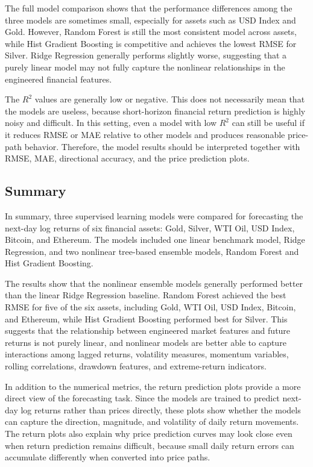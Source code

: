 \documentclass[12pt]{article}
\begin{document}
The full model comparison shows that the performance differences among the three models are sometimes small, especially for assets such as USD Index and Gold. However, Random Forest is still the most consistent model across assets, while Hist Gradient Boosting is competitive and achieves the lowest RMSE for Silver. Ridge Regression generally performs slightly worse, suggesting that a purely linear model may not fully capture the nonlinear relationships in the engineered financial features.

The $R^2$ values are generally low or negative. This does not necessarily mean that the models are useless, because short-horizon financial return prediction is highly noisy and difficult. In this setting, even a model with low $R^2$ can still be useful if it reduces RMSE or MAE relative to other models and produces reasonable price-path behavior. Therefore, the model results should be interpreted together with RMSE, MAE, directional accuracy, and the price prediction plots.

\subsection{Summary}

In summary, three supervised learning models were compared for forecasting the next-day log returns of six financial assets: Gold, Silver, WTI Oil, USD Index, Bitcoin, and Ethereum. The models included one linear benchmark model, Ridge Regression, and two nonlinear tree-based ensemble models, Random Forest and Hist Gradient Boosting.

The results show that the nonlinear ensemble models generally performed better than the linear Ridge Regression baseline. Random Forest achieved the best RMSE for five of the six assets, including Gold, WTI Oil, USD Index, Bitcoin, and Ethereum, while Hist Gradient Boosting performed best for Silver. This suggests that the relationship between engineered market features and future returns is not purely linear, and nonlinear models are better able to capture interactions among lagged returns, volatility measures, momentum variables, rolling correlations, drawdown features, and extreme-return indicators.

In addition to the numerical metrics, the return prediction plots provide a more direct view of the forecasting task. Since the models are trained to predict next-day log returns rather than prices directly, these plots show whether the models can capture the direction, magnitude, and volatility of daily return movements. The return plots also explain why price prediction curves may look close even when return prediction remains difficult, because small daily return errors can accumulate differently when converted into price paths.
\end{document}
